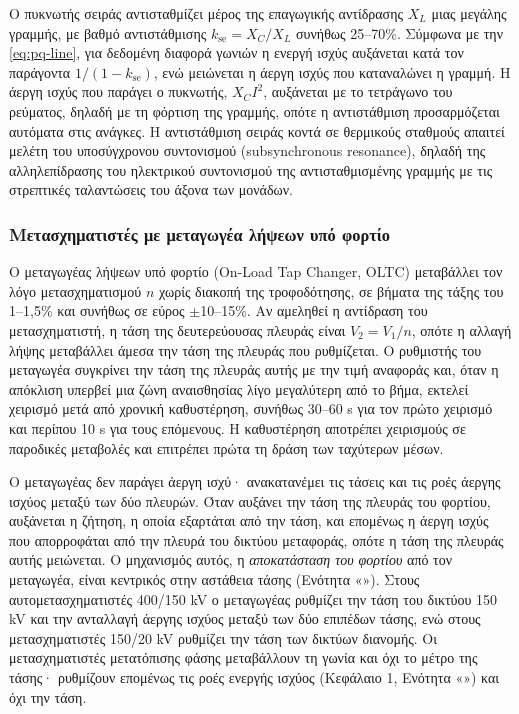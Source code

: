 Ο πυκνωτής σειράς αντισταθμίζει μέρος της επαγωγικής αντίδρασης $X_L$ μιας μεγάλης γραμμής,
με βαθμό αντιστάθμισης $k_{\mathrm{se}} = X_C / X_L$ συνήθως 25--70\%. Σύμφωνα με την
\eqref{eq:pq-line}, για δεδομένη διαφορά γωνιών η ενεργή ισχύς αυξάνεται κατά τον παράγοντα
$1/(1 - k_{\mathrm{se}})$, ενώ μειώνεται η άεργη ισχύς που καταναλώνει η γραμμή. Η άεργη
ισχύς που παράγει ο πυκνωτής, $X_C I^2$, αυξάνεται με το τετράγωνο του ρεύματος, δηλαδή με τη
φόρτιση της γραμμής, οπότε η αντιστάθμιση προσαρμόζεται αυτόματα στις ανάγκες. Η αντιστάθμιση
σειράς κοντά σε θερμικούς σταθμούς απαιτεί μελέτη του υποσύγχρονου συντονισμού
(subsynchronous resonance), δηλαδή της αλληλεπίδρασης του ηλεκτρικού συντονισμού της
αντισταθμισμένης γραμμής με τις στρεπτικές ταλαντώσεις του άξονα των μονάδων.

\subsubsection{Μετασχηματιστές με μεταγωγέα λήψεων υπό φορτίο}
\label{sec:oltc}

Ο μεταγωγέας λήψεων υπό φορτίο (On-Load Tap Changer, OLTC) μεταβάλλει τον λόγο
μετασχηματισμού $n$ χωρίς διακοπή της τροφοδότησης, σε βήματα της τάξης του 1--1,5\% και
συνήθως σε εύρος $\pm$10--15\%. Αν αμεληθεί η αντίδραση του μετασχηματιστή, η τάση της
δευτερεύουσας πλευράς είναι $V_2 = V_1/n$, οπότε η αλλαγή λήψης μεταβάλλει άμεσα την τάση
της πλευράς που ρυθμίζεται. Ο ρυθμιστής του μεταγωγέα συγκρίνει την τάση της πλευράς αυτής με
την τιμή αναφοράς και, όταν η απόκλιση υπερβεί μια ζώνη αναισθησίας λίγο μεγαλύτερη από το
βήμα, εκτελεί χειρισμό μετά από χρονική καθυστέρηση, συνήθως 30--60 s για τον πρώτο χειρισμό
και περίπου 10 s για τους επόμενους. Η καθυστέρηση αποτρέπει χειρισμούς σε παροδικές
μεταβολές και επιτρέπει πρώτα τη δράση των ταχύτερων μέσων.

Ο μεταγωγέας δεν παράγει άεργη ισχύ· ανακατανέμει τις τάσεις και τις ροές άεργης ισχύος
μεταξύ των δύο πλευρών. Όταν αυξάνει την τάση της πλευράς του φορτίου, αυξάνεται η ζήτηση, η
οποία εξαρτάται από την τάση, και επομένως η άεργη ισχύς που απορροφάται από την πλευρά του
δικτύου μεταφοράς, οπότε η τάση της πλευράς αυτής μειώνεται. Ο μηχανισμός αυτός, η
\emph{αποκατάσταση του φορτίου} από τον μεταγωγέα, είναι κεντρικός στην αστάθεια τάσης
(Ενότητα «»). Στους αυτομετασχηματιστές 400/150 kV ο μεταγωγέας
ρυθμίζει την τάση του δικτύου 150 kV και την ανταλλαγή άεργης ισχύος μεταξύ των δύο επιπέδων
τάσης, ενώ στους μετασχηματιστές 150/20 kV ρυθμίζει την τάση των δικτύων διανομής. Οι
μετασχηματιστές μετατόπισης φάσης μεταβάλλουν τη γωνία και όχι το μέτρο της τάσης· ρυθμίζουν
επομένως τις ροές ενεργής ισχύος (Κεφάλαιο 1, Ενότητα «») και όχι την τάση.

